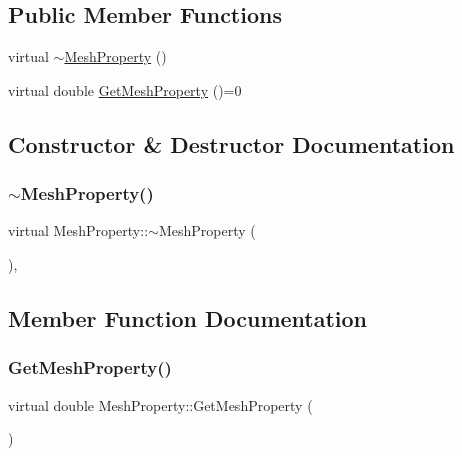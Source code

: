\subsection*{Public Member Functions}
\begin{DoxyCompactItemize}
\item 
virtual \mbox{\hyperlink{class_mesh_property_a4ac7b69cfdacadf447b7db8fcc533736}{$\sim$\+Mesh\+Property}} ()
\item 
virtual double \mbox{\hyperlink{class_mesh_property_a0a50701a5c33ce7aec5c413b409a754f}{Get\+Mesh\+Property}} ()=0
\end{DoxyCompactItemize}


\subsection{Constructor \& Destructor Documentation}
\mbox{\label{class_mesh_property_a4ac7b69cfdacadf447b7db8fcc533736}} 
\subsubsection{\texorpdfstring{$\sim$MeshProperty()}{~MeshProperty()}}
{\footnotesize\ttfamily virtual Mesh\+Property\+::$\sim$\+Mesh\+Property (\begin{DoxyParamCaption}{ }\end{DoxyParamCaption})\hspace{0.3cm}{\ttfamily [inline]}, {\ttfamily [virtual]}}



\subsection{Member Function Documentation}
\mbox{\label{class_mesh_property_a0a50701a5c33ce7aec5c413b409a754f}} 
\subsubsection{\texorpdfstring{GetMeshProperty()}{GetMeshProperty()}}
{\footnotesize\ttfamily virtual double Mesh\+Property\+::\+Get\+Mesh\+Property (\begin{DoxyParamCaption}{ }\end{DoxyParamCaption})\hspace{0.3cm}{\ttfamily [pure virtual]}}



